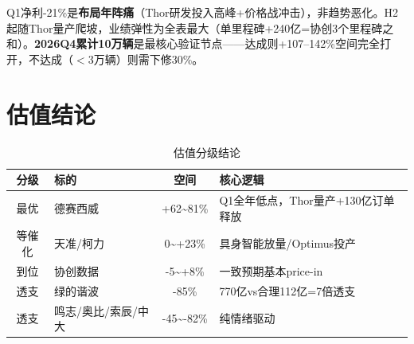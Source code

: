 \begin{keyinsight}[德赛西威核心判断]
Q1净利-21\%是\textbf{布局年阵痛}（Thor研发投入高峰+价格战冲击），非趋势恶化。H2起随Thor量产爬坡，业绩弹性为全表最大（单里程碑+240亿=协创3个里程碑之和）。\textbf{2026Q4累计10万辆}是最核心验证节点——达成则+107--142\%空间完全打开，不达成（$<$3万辆）则需下修30\%。
\end{keyinsight}

\section{估值结论}

\begin{table}[H]
\centering\small
\renewcommand{\arraystretch}{1.2}
\begin{tabularx}{\textwidth}{c l c X}
\toprule
\textbf{分级} & \textbf{标的} & \textbf{空间} & \textbf{核心逻辑} \\
\midrule
最优 & 德赛西威 & +62\textasciitilde81\% & Q1全年低点，Thor量产+130亿订单释放 \\
等催化 & 天准/柯力 & 0\textasciitilde+23\% & 具身智能放量/Optimus投产 \\
到位 & 协创数据 & -5\textasciitilde+8\% & 一致预期基本price-in \\
\textcolor{riskred}{透支} & 绿的谐波 & -85\% & 770亿vs合理112亿=7倍透支 \\
\textcolor{riskred}{透支} & 鸣志/奥比/索辰/中大 & -45\textasciitilde-82\% & 纯情绪驱动 \\
\bottomrule
\end{tabularx}
\caption{估值分级结论}
\end{table}
